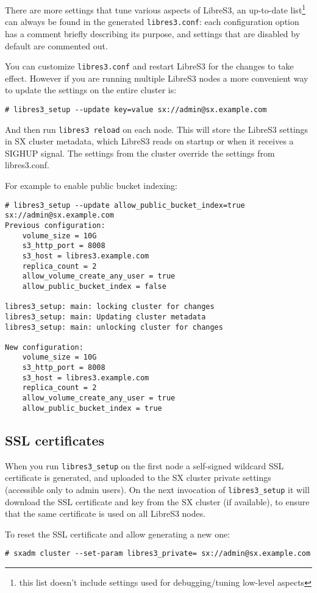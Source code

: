 There are more settings that tune various aspects of LibreS3, an up-to-date
list\footnote{this list doesn't include settings used for debugging/tuning
  low-level aspects} can always be found in the generated \verb|libres3.conf|: each configuration option has
a comment briefly describing its purpose, and settings that are disabled by
default are commented out.

You can customize \verb|libres3.conf| and restart LibreS3 for the changes to take effect.
However if you are running multiple LibreS3 nodes a more convenient way to
update the settings on the entire cluster is:
\begin{lstlisting}
# libres3_setup --update key=value sx://admin@sx.example.com
\end{lstlisting}
And then run \verb|libres3 reload| on each node.
This will store the LibreS3 settings in SX cluster metadata, which LibreS3 reads
on startup or when it receives a SIGHUP signal.
The settings from the cluster override the settings from libres3.conf.

For example to enable public bucket indexing:
\begin{lstlisting}
# libres3_setup --update allow_public_bucket_index=true sx://admin@sx.example.com
Previous configuration:
	volume_size = 10G
	s3_http_port = 8008
	s3_host = libres3.example.com
	replica_count = 2
	allow_volume_create_any_user = true
	allow_public_bucket_index = false

libres3_setup: main: locking cluster for changes
libres3_setup: main: Updating cluster metadata
libres3_setup: main: unlocking cluster for changes

New configuration:
	volume_size = 10G
	s3_http_port = 8008
	s3_host = libres3.example.com
	replica_count = 2
	allow_volume_create_any_user = true
	allow_public_bucket_index = true
\end{lstlisting}

\subsection{SSL certificates}

When you run \verb|libres3_setup| on the first node a self-signed wildcard SSL certificate is
generated, and uploaded to the SX cluster private settings (accessible only to
admin users).
On the next invocation of \verb|libres3_setup| it will download the SSL
certificate and key from the SX cluster (if available), to ensure that the same
certificate is used on all LibreS3 nodes.

To reset the SSL certificate and allow generating a new one:
\begin{lstlisting}
# sxadm cluster --set-param libres3_private= sx://admin@sx.example.com
\end{lstlisting}

